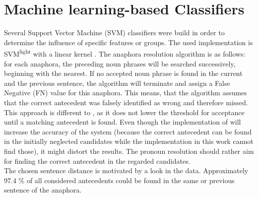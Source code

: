 \section{Machine learning-based Classifiers}
Several Support Vector Machine (SVM) classifiers were build in order to determine the influence of specific features or groups. The used implementation is SVM\textsuperscript{light} with a linear kernel \citep{joachims1999svmlight}. The anaphora resolution algorithm is as follows: for each anaphora, the preceding noun phrases will be searched successively, beginning with the nearest. If no accepted noun phrase is found in the current and the previous sentence, the algorithm will terminate and assign a False Negative (FN) value for this anaphora. This means, that the algorithm assumes that the correct antecedent was falsely identified as wrong and therefore missed. This approach is different to \cite{bergsma2005automatic}, as it does not lower the threshold for acceptance until a matching antecedent is found. Even though the implementation of \cite{bergsma2005automatic} will increase the accuracy of the system (because the correct antecedent can be found in the initially neglected candidates while the implementation in this work cannot find those), it might distort the results. The pronoun resolution should rather aim for finding the correct antecedent in the regarded candidates.\\
 The chosen sentence distance is motivated by a look in the data. Approximately 97.4 \% of all considered antecedents could be found in the same or previous sentence of the anaphora.
